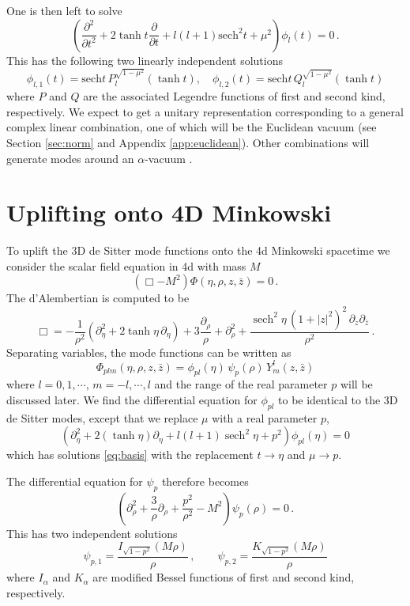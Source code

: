 \documentclass{brownthesis}
\DeclareMathOperator{\sech}{sech}
\begin{document}
One is then left to solve
\[
\left(\frac{\partial^{2}}{\partial t^{2}}+2\tanh t\frac{\partial}{\partial t}+l(l+1)\mathrm{sech}^{2}t+\mu^{2}\right)\phi_{l}(t)=0\,.
\]
This has the following two linearly independent solutions
\begin{equation}
\phi_{l,1}(t)=\mathrm{sech}t\,P_{l}^{\sqrt{1-\mu^{2}}}\left(\tanh t\right),\quad\phi_{l,2}(t)=\mathrm{sech}t\,Q_{l}^{\sqrt{1-\mu^{2}}}\left(\tanh t\right)\label{eq:basis}
\end{equation}
where $P$ and $Q$ are the associated Legendre functions of first
and second kind, respectively. We expect to get a unitary representation
corresponding to a general complex linear combination, one of which
will be the Euclidean vacuum (see Section \ref{sec:norm} and Appendix
\ref{app:euclidean}). Other combinations will generate modes around an
$\alpha$-vacuum \cite{PhysRevD.32.3136,GOLDSTEIN2003325,PhysRevD.69.023507}.

\section{Uplifting onto 4D Minkowski}

\label{sec:minkmodes}

To uplift the 3D de Sitter mode functions onto the 4d Minkowski spacetime
we consider the scalar field equation in 4d with mass $M$
\[
(\Box-M^{2})\Phi(\eta,\rho,z,\bar{z})=0\,.
\]
The d'Alembertian is computed to be
\[
\Box=-\frac{1}{\rho^{2}}(\partial_{\eta}^{2}+2\tanh\eta\,\partial_{\eta})+3\frac{\partial_{\rho}}{\rho}+\partial_{\rho}^{2}+\frac{\sech^{2}\eta\,(1+|z|^{2})^{2}\,\partial_{z}\partial_{\bar{z}}}{\rho^{2}}\,.
\]
Separating variables, the mode functions can be written as
\[
\Phi_{plm}(\eta,\rho,z,\bar{z})=\phi_{pl}(\eta)\,\psi_{p}(\rho)\,Y_{m}^{l}(z,\bar{z})
\]
where $l=0,1,\cdots$, $m=-l,\cdots,l$ and the range of the real
parameter $p$ will be discussed later. We find the differential equation
for $\phi_{pl}$ to be identical to the 3D de Sitter modes, except
that we replace $\mu$ with a real parameter $p$,
\[
\left(\partial_{\eta}^{2}+2(\tanh\eta)\partial_{\eta}+l(l+1)\sech^{2}\eta+p^{2}\right)\phi_{pl}(\eta)=0
\]
which has solutions \eqref{eq:basis} with the replacement $t\to\eta$
and $\mu\to p$.

The differential equation for $\psi_{p}$ therefore becomes
\[
\left(\partial_{\rho}^{2}+\frac{3}{\rho}\partial_{\rho}+\frac{p^{2}}{\rho^{2}}-M^{2}\right)\psi_{p}(\rho)=0\,.
\]
This has two independent solutions
\begin{equation}
\psi_{p,1}=\frac{I_{\sqrt{1-p^{2}}}(M\rho)}{\rho}\,,\qquad\psi_{p,2}=\frac{K_{\sqrt{1-p^{2}}}(M\rho)}{\rho}\label{eq:radialsol}
\end{equation}
where $I_{\alpha}$ and $K_{\alpha}$ are modified Bessel functions
of first and second kind, respectively.
\end{document}
